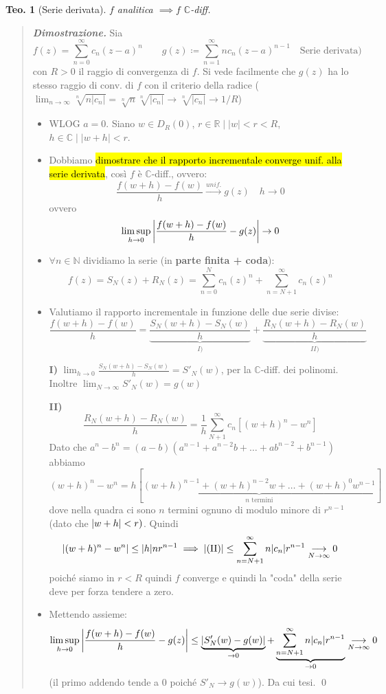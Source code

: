 \documentclass[a4paper,10pt]{article}
\newcommand{\re}{\mathbb{R}} %
\newcommand{\na}{\mathbb{N}} %
\newcommand{\im}{\mathbb{C}} %
\theoremstyle{indentdefinition}
\theoremstyle{indenttheorem}
\newtheorem{thm}{Teo.}
\theoremstyle{myremark}
\theoremstyle{indentgeneral}
\newenvironment{dimo}{\begin{quote}\textit{\textbf{Dimostrazione.}}}{\end{quote}} %
\begin{document}
\begin{thm}[Serie derivata]
    $f$ analitica $\implies f$ $\mathbb{C}$-diff.
\end{thm}

\begin{dimo} Sia
$$ f(z)= \sum_{n=0}^{\infty}c_n(z-a)^{n} \quad \quad g(z)\coloneqq \sum_{n=1}^{\infty}nc_n(z-a)^{n-1} \quad \text{Serie derivata)}$$
con $R>0$ il raggio di convergenza di $f$. Si vede facilmente che $g(z)$ ha lo stesso raggio di conv. di $f$ con il criterio della radice ($\lim_{n\to\infty}\sqrt[n]{n|c_n|}=\sqrt[n]{n}\sqrt[n]{|c_n|}\to\sqrt[n]{|c_n|}\to  1/R$)
    \begin{itemize}
        \item WLOG $a=0$. Siano $w\in D_R(0)$, $r\in \re\mid |w|<r<R$, $h\in\im\mid |w+h|<r$. \item Dobbiamo \hl{dimostrare che il rapporto incrementale converge unif. alla serie derivata}, così $f$ è $\im$-diff., ovvero:
        $$\frac{f(w+h)-f(w)}{h} \overset{unif.}{\longrightarrow} g(z) \quad h\to 0$$
        ovvero 
        $$\limsup_{h\to0}\abs{\frac{f(w+h)-f(w)}{h} - g(z)}\to 0$$
        \item $\forall n\in\na$ dividiamo la serie (in \textbf{parte finita + coda}):
        $$f(z)=S_N(z)+R_N(z)=\sum_{n=0}^{N}c_n(z)^{n}+\sum_{n=N+1}^{\infty}c_n(z)^{n}$$
        \item Valutiamo il rapporto incrementale in funzione delle due serie divise:
        $$\frac{f(w+h)-f(w)}{h}=\underbrace{\frac{S_N(w+h)-S_N(w)}{h}}_{I)}+\underbrace{\frac{R_N(w+h)-R_N(w)}{h}}_{II)}$$
        \item[\textbf{I)}] $\lim_{h\to 0}\frac{S_N(w+h)-S_N(w)}{h}=S'_N(w)$, per la $\im$-diff. dei polinomi. Inoltre $\lim_{N\to\infty} S'_N(w)=g(w)$
        \item[\textbf{II)}] $$\frac{R_N(w+h)-R_N(w)}{h}=\frac{1}{h}\sum_{N+1}^\infty c_n[(w+h)^n-w^n]$$
        Dato che $a^n-b^n=(a-b)(a^{n-1}+a^{n-2}b+\dots+ab^{n-2}+b^{n-1})$ abbiamo
        $$(w+h)^n-w^n=h[\underbrace{(w+h)^{n-1}+(w+h)^{n-2}w+\dots+(w+h)^0w^{n-1}}_{\text{$n$ termini}}]$$
        dove nella quadra ci sono $n$ termini ognuno di modulo minore di $r^{n-1}$ (dato che $\abs{w+h}<r)$. Quindi 
        $$\abs{(w+h)^n-w^n}\le\abs{h}nr^{n-1} \implies \abs{\text{(II)}}\le \sum_{n=N+1}^\infty  n\abs{c_n}r^{n-1}\underset{N\to\infty}{\longrightarrow}0$$
        poiché siamo in $r<R$ quindi $f$ converge e quindi la "coda" della serie deve per forza tendere a zero.
        \item Mettendo assieme:
        $$\limsup_{h\to0}\abs{\frac{f(w+h)-f(w)}{h} - g(z)}\le \underbrace{\abs{S'_N(w)-g(w)}}_{\to 0}+\underbrace{\sum_{n=N+1}^\infty n\abs{c_n}r^{n-1}}_{\to 0} \underset{N\to\infty}{\longrightarrow}0$$
(il primo addendo tende a 0 poiché $S'_N\to g(w)$). Da cui tesi. \qed        
    \end{itemize}
\end{dimo}
\end{document}
